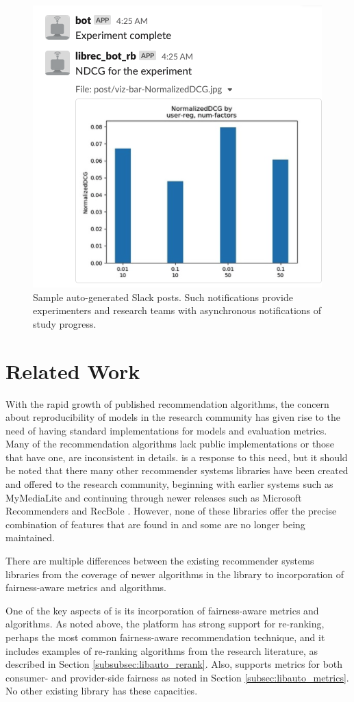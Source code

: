 \begin{figure}[!htb]
    \centering
    \includegraphics[width=0.6\linewidth]{imgs/la/slack-post.png}
    \caption{Sample auto-generated Slack posts. Such notifications provide experimenters and research teams with asynchronous notifications of study progress.}
    \label{fig:slack}
    \vspace{-0.15in}
\end{figure}

\section{Related Work}

With the rapid growth of published recommendation algorithms, the concern about reproducibility of models in the research community has given rise to the need of having standard implementations for models and evaluation metrics. Many of the recommendation algorithms lack public implementations or those that have one, are inconsistent in details. \libauto{} is a response to this need, but it should be noted that there many other recommender systems libraries have been created and offered to the research community, beginning with earlier systems such as MyMediaLite \cite{MyMediaLite} and continuing through newer releases such as Microsoft Recommenders \cite{MicrosoftRecommenders} and RecBole \cite{recbole}. However, none of these libraries offer the precise combination of features that are found in \libauto{} and some are no longer being maintained.

There are multiple differences between the existing recommender systems libraries from the coverage of newer algorithms in the library to incorporation of fairness-aware metrics and algorithms.

One of the key aspects of \libauto{} is its incorporation of fairness-aware metrics and algorithms. As noted above, the platform has strong support for re-ranking, perhaps the most common fairness-aware recommendation technique, and it includes examples of re-ranking algorithms from the research literature, as described in Section \ref{subsubsec:libauto_rerank}. Also, \libauto{} supports metrics for both consumer- and provider-side fairness as noted in Section \ref{subsec:libauto_metrics}. No other existing library has these capacities. 

